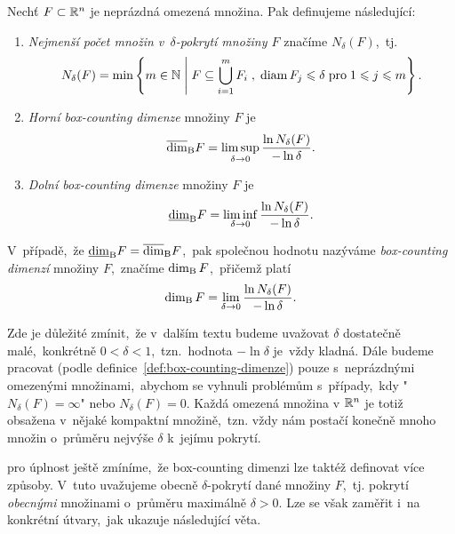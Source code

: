 \begin{definition}\label{def:box-counting-dimenze}
    Nechť $F\subset \mathbb{R}^n$ je neprázdná omezená množina. Pak definujeme následující:
    \begin{enumerate}[label=(\alph*)]
        \item \emph{Nejmenší počet množin v~$\delta$-pokrytí množiny $F$} značíme $N_\delta(F)$,~tj.
        \[N_\delta(F)=\min\left\{m\in\mathbb{N}\;\middle|\;F\subseteq\bigcup_{i=1}^m F_i\;,\;\operatorname{diam}{F_j}\leqslant\delta\;\text{pro}\;1\leqslant j\leqslant m\right\}.\]
        \item \emph{Horní box-counting dimenze} množiny $F$ je
        \[\overline{\dim}_\textup{B}{F}=\limsup_{\delta\to 0}\dfrac{\ln{N_\delta(F)}}{-\ln{\delta}}.\]
        \item \emph{Dolní box-counting dimenze} množiny $F$ je
        \[\underline{\dim}_\textup{B}{F}=\liminf_{\delta\to 0}\dfrac{\ln{N_\delta(F)}}{-\ln{\delta}}.\]
    \end{enumerate}
    V~případě,~že $\underline{\dim}_\textup{B}{F}=\overline{\dim}_\textup{B}{F}$,~pak společnou hodnotu nazýváme \emph{box-counting dimenzí} množiny $F$,~značíme $\operatorname{dim_B}{F}$,~přičemž platí
    \[\operatorname{dim_B}{F}=\lim_{\delta\to 0}\dfrac{\ln{N_\delta(F)}}{-\ln{\delta}}.\]
\end{definition}
\begin{remark}
    Zde je důležité zmínit,~že v~dalším textu budeme uvažovat $\delta$ dostatečně malé,~konkrétně $0<\delta<1$,~tzn.~hodnota $-\ln{\delta}$ je~vždy kladná. Dále budeme pracovat (podle definice~\ref{def:box-counting-dimenze}) pouze s~neprázdnými omezenými množinami,~abychom se vyhnuli problémům s~případy,~kdy "$N_\delta(F)=\infty$" nebo $N_\delta(F)=0$. Každá omezená množina v $\mathbb{R}^n$ je totiž obsažena v~nějaké kompaktní množině,~tzn. vždy nám postačí konečně mnoho množin o~průměru nejvýše $\delta$ k~jejímu pokrytí.
\end{remark}
pro úplnost ještě zmíníme,~že box-counting dimenzi lze taktéž definovat více způsoby. V~tuto uvažujeme obecně $\delta$-pokrytí dané množiny $F$,~tj. pokrytí \emph{obecnými} množinami o~průměru maximálně $\delta>0$. Lze se však zaměřit i~na konkrétní útvary,~jak ukazuje následující věta.
